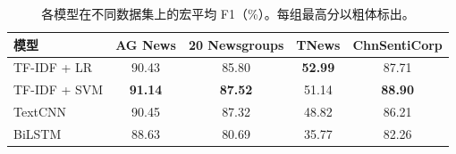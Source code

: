 \begin{table}[htbp]
\centering
\caption{各模型在不同数据集上的宏平均 F1（\%）。每组最高分以粗体标出。}
\label{tab:main-results}
\small
\begin{tabular}{lcccc}
\toprule
模型 & AG News & 20 Newsgroups & TNews & ChnSentiCorp \\
\midrule
TF-IDF + LR & 90.43 & 85.80 & \textbf{52.99} & 87.71 \\
TF-IDF + SVM & \textbf{91.14} & \textbf{87.52} & 51.14 & \textbf{88.90} \\
TextCNN & 90.45 & 87.32 & 48.82 & 86.21 \\
BiLSTM & 88.63 & 80.69 & 35.77 & 82.26 \\
\bottomrule
\end{tabular}
\end{table}
